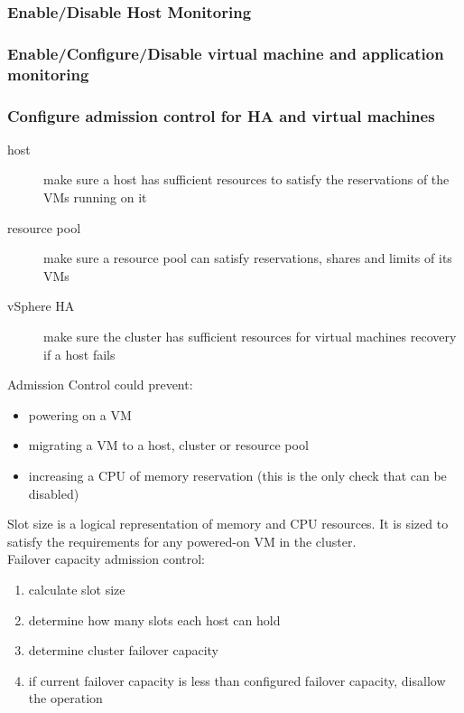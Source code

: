 \subsubsection{Enable/Disable Host Monitoring}

\subsubsection{Enable/Configure/Disable virtual machine and application monitoring}

\subsubsection{Configure admission control for HA and virtual machines}

\begin{description}

\item[host]
make sure a host has sufficient resources to satisfy the reservations of the
VMs running on it

\item[resource pool]
make sure a resource pool can satisfy reservations, shares and limits of its
VMs

\item[vSphere HA]
make sure the cluster has sufficient resources for virtual machines recovery
if a host fails

\end{description}

Admission Control could prevent:

\begin{itemize}
\item powering on a VM
\item migrating a VM to a host, cluster or resource pool
\item increasing a CPU of memory reservation (this is the only check that can
be disabled)
\end{itemize}

Slot size is a logical representation of memory and CPU resources. It is sized
to satisfy the requirements for any powered-on VM in the cluster.\\

Failover capacity admission control:

\begin{enumerate}
\item calculate slot size
\item determine how many slots each host can hold
\item determine cluster failover capacity
\item if current failover capacity is less than configured failover capacity,
disallow the operation
\end{enumerate}

